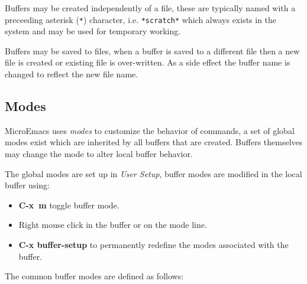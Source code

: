 \documentclass[11pt,a4paper,pdftex]{article}
\begin{document}
  Buffers may be created independently of a file, these are typically named
  with a preceeding asterisk (\texttt{*}) character, i.e. \texttt{*scratch*}
  which always exists in the system and may be used for temporary working.

  Buffers may be saved to files, when a buffer is saved to a different file
  then a new file is created or existing file is over-written. As a side
  effect the buffer name is changed to reflect the new file name.

\subsection{Modes}

  MicroEmacs uses \textit{modes} to customize the behavior of commands, a set
  of global modes exist which are inherited by all buffers that are created.
  Buffers themselves may change the mode to alter local buffer behavior.

  The global modes are set up in \textit{User Setup}, buffer modes are
  modified in the local buffer using:

  \begin{itemize}
    {\setlength{\itemsep}{0ex}}
    \item \textbf{C-x~m} toggle buffer mode.
    \item Right mouse click in the buffer or on the mode line.
    \item \textbf{C-x buffer-setup} to permanently redefine the modes
    associated with the buffer.
  \end{itemize}

  The common buffer modes are defined as follows:
\end{document}
